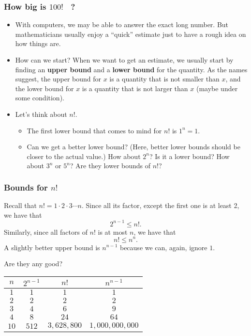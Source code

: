 \begin{frame}\frametitle{How big is $100!$ \ ?}
  \begin{itemize}
  \item
    With computers, we may be able to answer the exact long number.
    But mathematicians usually enjoy a ``quick'' estimate just to have
    a rough idea on how things are.

  \item
    How can we start? \pause When we want to get an estimate, we
    usually start by finding an {\bf upper bound} and a {\bf lower
      bound} for the quantity. \pause As the names suggest, the upper
    bound for $x$ is a quantity that is not smaller than $x$, and the
    lower bound for $x$ is a quantity that is not larger than $x$
    (maybe under some condition). \pause

  \item
    Let's think about $n!$.  \pause
    \begin{itemize}
    \item The first lower bound that comes to mind for $n!$ is $1^n = 1$.
      \pause
    \item Can we get a better lower bound?  (Here, better lower bounds
      should be closer to the actual value.) \pause How about $2^n$?
      Is it a lower bound? \pause How about $3^n$ or $5^n$? Are they
      lower bounds of $n!$?
    \end{itemize}
  \end{itemize}
\end{frame}

\begin{frame}\frametitle{Bounds for $n!$}
  Recall that $n!=1\cdot 2\cdot 3\cdots n$.  Since all its factor,
  except the first one is at least 2, we have that
  \[ 2^{n-1}\leq n!. \] \pause
  Similarly, since all factors of $n!$ is at most $n$, we have that
  \[ n! \leq n^n.\] \pause
  A slightly better upper bound is $n^{n-1}$ because we can, again,
  ignore $1$.
  \pause

  \vspace{0.1in}
  Are they any good? \pause

  {\small
  \begin{tabular}{c|c|c|c}
    $n$ & $2^{n-1}$ & $n!$ & $n^{n-1}$ \\ \hline
    $1$ & $1$ & $1$ & $1$ \\
    $2$ & $2$ & $2$ & $2$ \\
    $3$ & $4$ & $6$ & $9$ \\
    $4$ & $8$ & $24$ & $64$ \\
    $10$ & $512$ & $3,628,800$ & $1,000,000,000$
  \end{tabular}
  }
\end{frame}

